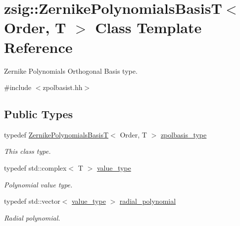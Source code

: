 \hypertarget{classzsig_1_1ZernikePolynomialsBasisT}{
\section{zsig::ZernikePolynomialsBasisT$<$ Order, T $>$ Class Template Reference}
\label{classzsig_1_1ZernikePolynomialsBasisT}
}


Zernike Polynomials Orthogonal Basis type.  




{\ttfamily \#include $<$zpolbasist.hh$>$}

\subsection*{Public Types}
\begin{DoxyCompactItemize}
\item 
typedef \hyperlink{classzsig_1_1ZernikePolynomialsBasisT}{ZernikePolynomialsBasisT}$<$ Order, T $>$ \hyperlink{classzsig_1_1ZernikePolynomialsBasisT_a05b99b289230f11495b77913b042c8ca}{zpolbasis\_\-type}
\begin{DoxyCompactList}\small\item\em This class type. \item\end{DoxyCompactList}\item 
typedef std::complex$<$ T $>$ \hyperlink{classzsig_1_1ZernikePolynomialsBasisT_ab95fd66256ec93a9cbeafc4304362a59}{value\_\-type}
\begin{DoxyCompactList}\small\item\em Polynomial value type. \item\end{DoxyCompactList}\item 
typedef std::vector$<$ \hyperlink{classzsig_1_1ZernikePolynomialsBasisT_ab95fd66256ec93a9cbeafc4304362a59}{value\_\-type} $>$ \hyperlink{classzsig_1_1ZernikePolynomialsBasisT_a4b199b40b343b7451c043c7375da5ee1}{radial\_\-polynomial}
\begin{DoxyCompactList}\small\item\em Radial polynomial. \item\end{DoxyCompactList}\end{DoxyCompactItemize}
